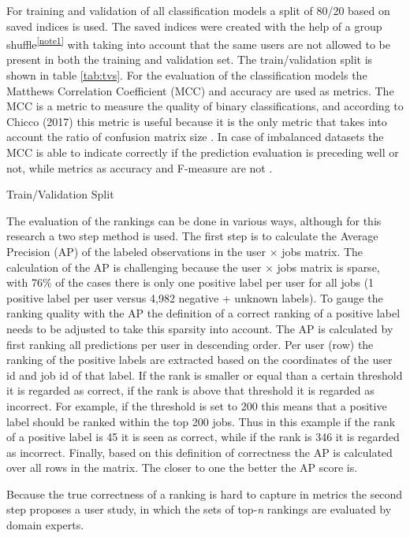 For training and validation of all classification models a split of 80/20 based on saved indices is used. 
The saved indices were created with the help of a group shuffle\textsuperscript{\ref{note1}} with taking into account that the same users are not allowed to be present in both the training and validation set.
The train/validation split is shown in table \ref{tab:tvs}.
For the evaluation of the classification models the Matthews Correlation Coefficient (MCC) \cite{matthews1975comparison} and accuracy are used as metrics.
The MCC is a metric to measure the quality of binary classifications, and according to Chicco (2017) this metric is useful because it is the only metric that takes into account the ratio of confusion matrix size \cite{chicco2017ten}.
In case of imbalanced datasets the MCC is able to indicate correctly if the prediction evaluation is preceding well or not, while metrics as accuracy and F-measure are not \cite{boughorbel2017optimal}.

\begin{table}[h]
\begin{footnotesize}

\end{footnotesize}
\caption{\label{tab:tvs} \footnotesize{Train/Validation Split}}
\end{table}

The evaluation of the rankings can be done in various ways, although for this research a two step method is used. 
The first step is to calculate the Average Precision (AP) of the labeled observations in the user $\times$ jobs matrix.
The calculation of the AP is challenging because the user $\times$ jobs matrix is sparse, with 76\% of the cases there is only one positive label per user for all jobs (1 positive label per user versus 4,982 negative + unknown labels).
To gauge the ranking quality with the AP the definition of a correct ranking of a positive label needs to be adjusted to take this sparsity into account. 
The AP is calculated by first ranking all predictions per user in descending order.
Per user (row) the ranking of the positive labels are extracted based on the coordinates of the user id and job id of that label.
If the rank is smaller or equal than a certain threshold it is regarded as correct, if the rank is above that threshold it is regarded as incorrect. 
For example, if the threshold is set to 200 this means that a positive label should be ranked within the top 200 jobs. 
Thus in this example if the rank of a positive label is 45 it is seen as correct, while if the rank is 346 it is regarded as incorrect.
Finally, based on this definition of correctness the AP is calculated over all rows in the matrix.
The closer to one the better the AP score is.

Because the true correctness of a ranking is hard to capture in metrics the second step proposes a user study, in which the sets of top-\textit{n} rankings are evaluated by domain experts. 